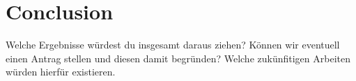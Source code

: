 
\chapter{Conclusion\label{ch:conclusion}}

Welche Ergebnisse würdest du insgesamt daraus ziehen? Können wir eventuell einen Antrag stellen und diesen damit begründen? Welche zukünfitigen Arbeiten würden hierfür existieren.
